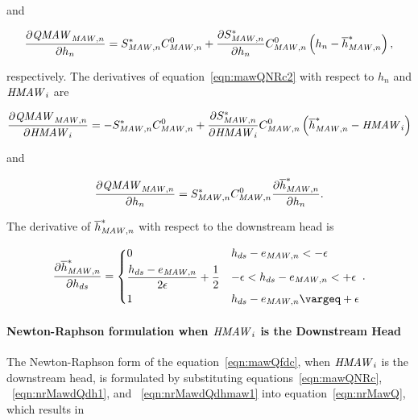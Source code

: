 \noindent and

\begin{equation}
	\label{eqn:nrMawdQdhmaw1}
	\frac{\partial \mathit{QMAW}_{\mathit{MAW},n}}{\partial h_n} = S_{\mathit{MAW},n}^* C_{\mathit{MAW},n}^0 + \frac{\partial S_{\mathit{MAW},n}^*}{\partial h_n} C_{\mathit{MAW},n}^0 \left( h_n - \overline{h}^*_{\mathit{MAW},n} \right) ,
\end{equation}

\noindent respectively. The derivatives of equation~\ref{eqn:mawQNRc2} with respect to $h_n$ and $\mathit{HMAW}_i$ are

\begin{equation}
	\label{eqn:nrMawdQdh2}
	\frac{\partial \mathit{QMAW}_{\mathit{MAW},n}}{\partial \mathit{HMAW}_i} =  -S_{\mathit{MAW},n}^* C_{\mathit{MAW},n}^0 + \frac{\partial S_{\mathit{MAW},n}^*}{\partial \mathit{HMAW}_i} C_{\mathit{MAW},n}^0 \left( \overline{h}^*_{\mathit{MAW},n} - \mathit{HMAW}_{i} \right)
	\end{equation}

\noindent and

\begin{equation}
	\label{eqn:nrMawdQdhmaw2}
	\frac{\partial \mathit{QMAW}_{\mathit{MAW},n}}{\partial h_n} =  S_{\mathit{MAW},n}^* C_{\mathit{MAW},n}^0 \frac{\partial \overline{h}^*_{\mathit{MAW},n}}{\partial h_n} .
\end{equation}

The derivative of $\overline{h}^*_{\mathit{MAW},n}$ with respect to the downstream head is

\begin{align}
	\label{eqn:maw-cdhbar}
	\frac{\partial \overline{h}^*_{\mli{MAW},n}}{\partial h_{ds}} = \begin{dcases}
		0 &  h_{ds} - e_{\mli{MAW},n} < -\epsilon \\
		\frac{h_{ds} - e_{\mli{MAW},n}}{2 \epsilon} + \frac{1}{2} & -\epsilon < h_{ds} - e_{\mli{MAW},n} < +\epsilon \\
		1 & h_{ds} - e_{\mli{MAW},n} \ge +\epsilon
	\end{dcases} .
\end{align}


\paragraph{Newton-Raphson formulation when $\mathit{HMAW}_i$ is the Downstream Head}

The Newton-Raphson form of the equation~\ref{eqn:mawQfdc}, when $\mathit{HMAW}_i$ is the downstream head, is formulated by substituting equations~\ref{eqn:mawQNRc}, ~\ref{eqn:nrMawdQdh1}, and ~\ref{eqn:nrMawdQdhmaw1} into equation~\ref{eqn:nrMawQ}, which results in


